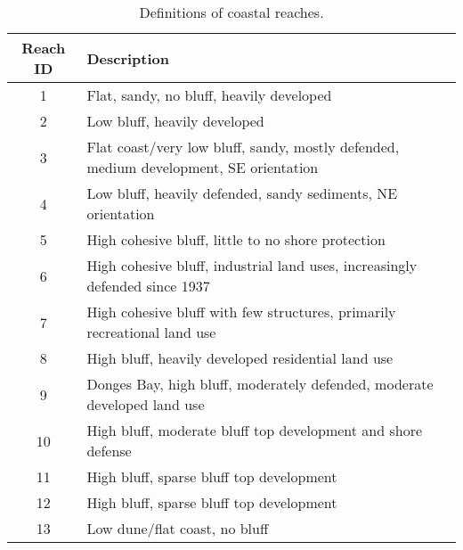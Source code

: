 \begin{table}[htbp]
  \caption{Definitions of coastal reaches.}
  \centering
  \setlength{\tabcolsep}{8pt}
  \renewcommand{\arraystretch}{1.15}
  \begin{tabularx}{\textwidth}{c X}
    \toprule
    \textbf{Reach ID} & \textbf{Description} \\
    \midrule
    1  & Flat, sandy, no bluff, heavily developed \\
    2  & Low bluff, heavily developed \\
    3  & Flat coast/very low bluff, sandy, mostly defended, medium development, SE orientation \\
    4  & Low bluff, heavily defended, sandy sediments, NE orientation \\
    5  & High cohesive bluff, little to no shore protection \\
    6  & High cohesive bluff, industrial land uses, increasingly defended since 1937 \\
    7  & High cohesive bluff with few structures, primarily recreational land use \\
    8  & High bluff, heavily developed residential land use \\
    9  & Donges Bay, high bluff, moderately defended, moderate developed land use \\
    10 & High bluff, moderate bluff top development and shore defense \\
    11 & High bluff, sparse bluff top development \\
    12 & High bluff, sparse bluff top development \\
    13 & Low dune/flat coast, no bluff \\
    \bottomrule
  \end{tabularx}
  \label{tab:tab2.1}
\end{table}
